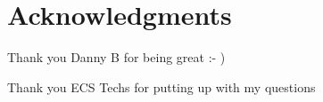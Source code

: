 \chapter*{Acknowledgments}\label{C:ack} 
Thank you Danny B for being great :- ) 

Thank you ECS Techs for putting up with my questions 
